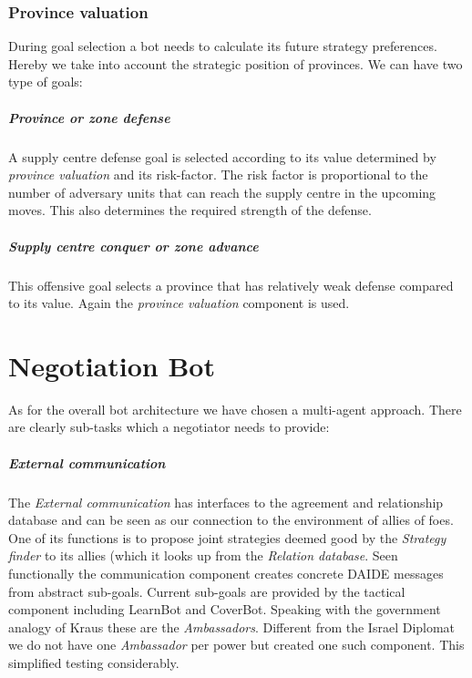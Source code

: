 \documentclass[pdftex,12pt,a4paper]{report}
\begin{document}
\subsection{Province valuation}
During goal selection a bot needs to calculate its future strategy
preferences. Hereby we take into account the strategic position of 
provinces. We can have two type of goals:

\paragraph{Province or zone defense}
A supply centre defense goal is selected according to its value
determined by \textit{province valuation} and its risk-factor. The
risk factor is proportional to the number of adversary units that 
can reach the supply centre in the upcoming moves. This also determines
the required strength of the defense.

\paragraph{Supply centre conquer or zone advance}
This offensive goal selects a province that has relatively weak 
defense compared to its value. Again the \textit{province valuation}
component is used.




\chapter{Negotiation Bot}

As for the overall bot architecture we have chosen a multi-agent 
approach. There are clearly sub-tasks which a negotiator needs to
provide:

\paragraph{External communication}
The \textit{External communication} has interfaces to the agreement 
and relationship database and can be seen as our connection to the
environment of allies of foes. One of its functions is to propose
joint strategies deemed good by the \textit{Strategy finder} to its
allies (which it looks up from the \textit{Relation database}. Seen
functionally the communication component creates concrete DAIDE
messages from abstract sub-goals. Current sub-goals are provided
by the tactical component including LearnBot and CoverBot. Speaking
with the government analogy of Kraus \cite{Kraus89} these are the
\textit{Ambassadors}. Different from the Israel Diplomat we do not
have one \textit{Ambassador} per power but created one such 
component. This simplified testing considerably. 
\end{document}
